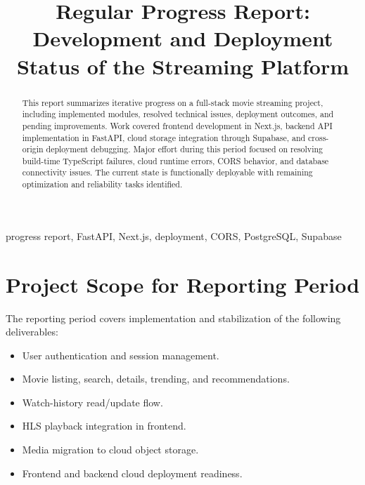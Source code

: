 \documentclass[conference]{IEEEtran}
\title{Regular Progress Report:\\Development and Deployment Status of the Streaming Platform}
\author{
\IEEEauthorblockN{Mustakim Ahmed Hasan}
\IEEEauthorblockA{
Department of Computer Science and Engineering\\
North South University\\
Email: mustakimahmedhasan@gmail.com
}
}
\begin{document}
\maketitle

\begin{abstract}
This report summarizes iterative progress on a full-stack movie streaming project, including implemented modules, resolved technical issues, deployment outcomes, and pending improvements. Work covered frontend development in Next.js, backend API implementation in FastAPI, cloud storage integration through Supabase, and cross-origin deployment debugging. Major effort during this period focused on resolving build-time TypeScript failures, cloud runtime errors, CORS behavior, and database connectivity issues. The current state is functionally deployable with remaining optimization and reliability tasks identified.
\end{abstract}

\begin{IEEEkeywords}
progress report, FastAPI, Next.js, deployment, CORS, PostgreSQL, Supabase
\end{IEEEkeywords}

\section{Project Scope for Reporting Period}
The reporting period covers implementation and stabilization of the following deliverables:
\begin{itemize}
\item User authentication and session management.
\item Movie listing, search, details, trending, and recommendations.
\item Watch-history read/update flow.
\item HLS playback integration in frontend.
\item Media migration to cloud object storage.
\item Frontend and backend cloud deployment readiness.
\end{itemize}
\end{document}

